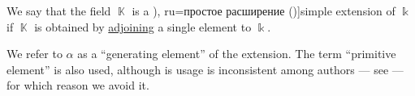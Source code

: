 \begin{definition}\label{def:simple_field_extension}
  We say that the field \( \BbbK \) is a \term[bg=просто разширение (\cite[def. VI.3]{ГеновМиховскиМоллов1991Алгебра}), ru=простое расширение (\cite[409]{Винберг2014Алгебра})]{simple extension} of \( \Bbbk \) if \( \BbbK \) is obtained by \hyperref[def:field_adjunction]{adjoining} a single element to \( \Bbbk \).
\end{definition}
\begin{comments}
  \item We refer to \( \alpha \) as a \enquote{generating element} of the extension. The term \enquote{primitive element} is also used, although is usage is inconsistent among authors --- see  --- for which reason we avoid it.
\end{comments}

